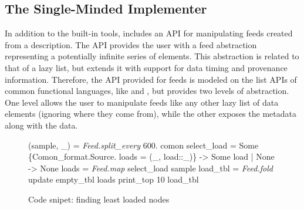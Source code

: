 

\subsection{The Single-Minded Implementer}

In addition to the built-in tools, \padsd{} includes an API for
manipulating feeds created from a description. The API provides the
user with a feed abstraction representing a potentially infinite
series of elements. This abstraction is related to that of a lazy
list, but extends it with support for data timing and provenance
information. Therefore, the API provided for feeds is modeled on the
list APIs of common functional languages, like \ocaml and \haskell,
but provides two levels of abstraction. One level allows the user to
manipulate feeds like any other lazy list of data elements (ignoring
where they come from), while the other exposes the metadata along with
the data. 



\begin{figure}[tb]
\begin{codebox}
 (sample, \_) = \textit{Feed.split_every} 600. comon 
 select_load = 
    Some \{Comon_format.Source.
          loads = (_, load::_)\} -> Some load
  | None -> None 
 loads    = \textit{Feed.map} select_load sample 
 load_tbl = \textit{Feed.fold} update empty_tbl loads 
  print_top 10 load_tbl
\end{codebox}
  \caption{Code snipet: finding least loaded \planetlab nodes}
\label{fig:sample-loads}
\end{figure}



